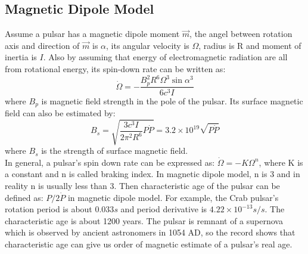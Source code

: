 \documentclass[12pt]{report}
\begin{document}
        \subsection{Magnetic Dipole Model}
            Assume a pulsar has a magnetic dipole moment $\vec{m}$, the angel between rotation axis and 
            direction of 
            $\vec{m}$ is $\alpha$, its angular velocity is $\Omega$, radius is R and moment of inertia is $I$. 
            Also by 
            assuming that energy of electromagnetic radiation are all from rotational energy, its spin-down 
            rate can be written 
            as: 
            $$
                \dot{\Omega}=-\frac{B_p^2 R^6 \Omega^3 \sin{\alpha}^3}{6c^3I}
            $$
            where $B_p$ is magnetic field strength in the pole of the pulsar. Its surface magnetic field can 
            also be estimated
            by:
            $$
                B_s=\sqrt{\frac{3c^3I}{2\pi^2R^6}P\dot{P}}=3.2\times 10^{19}\sqrt{P\dot{P}}
            $$
            where $B_s$ is the strength of surface magnetic field. \\
            \indent In general, a pulsar's spin down rate can be expressed as: $\dot{\Omega}=-K\Omega^{n}$, 
            where K is a 
            constant and n is called braking index. In magnetic dipole model, n is 3 and in reality n is 
            usually less than 3. Then 
            characteristic age of the pulsar can be defined as: $P/2\dot{P}$ in magnetic dipole model. 
            For example, the Crab 
            pulsar's rotation period is about $0.033s$ and period derivative is $4.22\times 10^{-13}s/s$. 
            The characteristic 
            age is about 1200 years. The pulsar is remnant of a supernova which is observed by ancient 
            astronomers in 1054 
            AD, so the record shows that characteristic age can give us order of magnetic estimate of a 
            pulsar's real age. 

          
\end{document}
